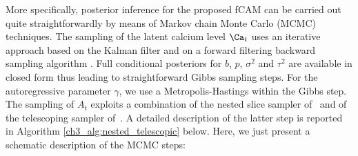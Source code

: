 More specifically, posterior inference for the proposed fCAM can be carried out quite straightforwardly by means of Markov chain Monte Carlo (MCMC) techniques. The sampling of the latent calcium level $\Ca_t$ uses an iterative approach based on the Kalman filter and on a forward filtering backward sampling algorithm \citep{prado2010}.
Full conditional posteriors for $b$, $p$, $\sigma^2$ and $\tau^2$ are available in closed form thus leading to straightforward Gibbs sampling steps. For the autoregressive parameter $\gamma$, we use a Metropolis-Hastings within the Gibbs step. 
The sampling of $A_t$ exploits a combination of the nested slice sampler of~\citet{denti2021} and of the telescoping sampler of~\citet{fruhwirthschnatter2020}. A detailed description of the latter step is reported in Algorithm \ref{ch3_alg:nested_telescopic} below. Here, we just present a schematic description of the MCMC steps:
